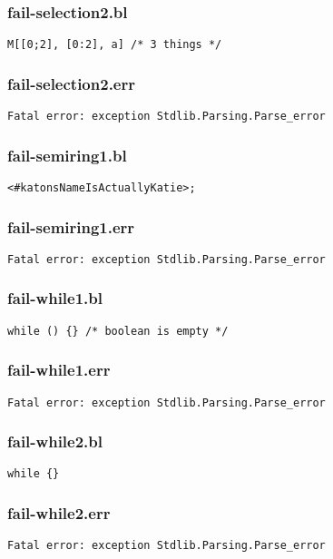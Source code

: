 \subsubsection{fail-selection2.bl}
\begin{lstlisting}
M[[0;2], [0:2], a] /* 3 things */\end{lstlisting}
\subsubsection{fail-selection2.err}
\begin{lstlisting}
Fatal error: exception Stdlib.Parsing.Parse_error
\end{lstlisting}
\subsubsection{fail-semiring1.bl}
\begin{lstlisting}
<#katonsNameIsActuallyKatie>;\end{lstlisting}
\subsubsection{fail-semiring1.err}
\begin{lstlisting}
Fatal error: exception Stdlib.Parsing.Parse_error
\end{lstlisting}
\subsubsection{fail-while1.bl}
\begin{lstlisting}
while () {} /* boolean is empty */\end{lstlisting}
\subsubsection{fail-while1.err}
\begin{lstlisting}
Fatal error: exception Stdlib.Parsing.Parse_error
\end{lstlisting}
\subsubsection{fail-while2.bl}
\begin{lstlisting}
while {}\end{lstlisting}
\subsubsection{fail-while2.err}
\begin{lstlisting}
Fatal error: exception Stdlib.Parsing.Parse_error
\end{lstlisting}
